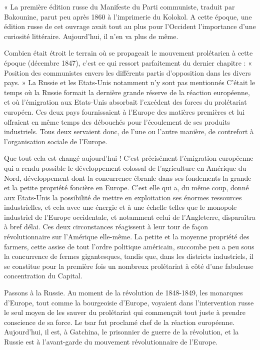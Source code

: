 \documentclass[french,twoside]{book} %
\newenvironment{quoteblock}%
  {\begin{quoting}}
  {\end{quoting}}
\newenvironment{quotebar}{%
    \def\FrameCommand{{\color{rubric!10!}\vrule width 0.5em} \hspace{0.9em}}%
    \def\OuterFrameSep{\itemsep} %
    \MakeFramed {\advance\hsize-\width \FrameRestore}
  }%
  {%
    \endMakeFramed
  }
\renewenvironment{quoteblock}%
  {%
    \savenotes
    \setstretch{0.9}
    \begin{quotebar}
  }
  {%
    \end{quotebar}
    \spewnotes
  }
\begin{document}
\begin{quoteblock}
 \noindent « La première édition russe du Manifeste du Parti communiste, traduit par Bakounine, parut peu après 1860 à l’imprimerie du Kolokol. A cette époque, une édition russe de cet ouvrage avait tout au plus pour l’Occident l’importance d’une curiosité littéraire. Aujourd’hui, il n’en va plus de même.\par
 Combien était étroit le terrain où se propageait le mouvement prolétarien à cette époque (décembre 1847), c’est ce qui ressort parfaitement du dernier chapitre : « Position des communistes envers les différents partis d’opposition dans les divers pays. » La Russie et les Etats-Unis notamment n’y sont pas mentionnés C’était le temps où la Russie formait la dernière grande réserve de la réaction européenne, et où l’émigration aux Etats-Unis absorbait l’excédent des forces du prolétariat européen. Ces deux pays fournissaient à l’Europe des matières premières et lui offraient en même temps des débouchés pour l’écoulement de ses produits industriels. Tous deux servaient donc, de l’une ou l’autre manière, de contrefort à l’organisation sociale de l’Europe.\par
 Que tout cela est changé aujourd’hui ! C'est précisément l’émigration européenne qui a rendu possible le développement colossal de l’agriculture en Amérique du Nord, développement dont la concurrence ébranle dans ses fondements la grande et la petite propriété foncière en Europe. C'est elle qui a, du même coup, donné aux Etats-Unis la possibilité de mettre en exploitation ses énormes ressources industrielles, et cela avec une énergie et à une échelle telles que le monopole industriel de l’Europe occidentale, et notamment celui de l’Angleterre, disparaîtra à bref délai. Ces deux circonstances réagissent à leur tour de façon révolutionnaire sur l’Amérique elle-même. La petite et la moyenne propriété des farmers, cette assise de tout l’ordre politique américain, succombe peu a peu sous la concurrence de fermes gigantesques, tandis que, dans les districts industriels, il se constitue pour la première fois un nombreux prolétariat à côté d’une fabuleuse concentration du Capital.\par
 Passons à la Russie. Au moment de la révolution de 1848-1849, les monarques d’Europe, tout comme la bourgeoisie d’Europe, voyaient dans l’intervention russe le seul moyen de les sauver du prolétariat qui commençait tout juste à prendre conscience de sa force. Le tsar fut proclamé chef de la réaction européenne. Aujourd’hui, il est, à Gatchina, le prisonnier de guerre de la révolution, et la Russie est à l’avant-garde du mouvement révolutionnaire de l’Europe.\par

\end{quoteblock}
\end{document}
